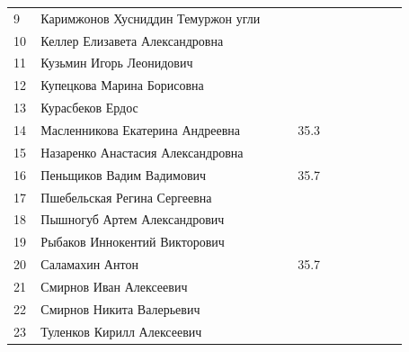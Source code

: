\documentclass[a4paper,landscape,11pt]{article}
\newcommand*\ok{&{\small \ding{51}}} %
\newcommand*\no{&{\small }} %
\begin{document}
\begin{tabular}{p{7pt}|l|p{\CS}|p{\CS}|p{\CT}|p{\CS}|p{\CS}|p{\CS}|p{\CS}|p{\CS}|p{\CS}}
9\,&   Каримжонов Хусниддин Темуржон угли \no\no\no  &&&&&\\
10\,&  Келлер Елизавета Александровна     \ok\ok\ok  &&&&\\
\midrule
11\,&  Кузьмин Игорь Леонидович           \ok\no\no  &&&&&\\ 
12\,&  Купецкова Марина Борисовна         \ok\no\no  &&&&&\\
13\,&  Курасбеков Ердос                   \ok\no\no  &&&&&\\
14\,&  Масленникова Екатерина Андреевна   \ok\ok&35.3&&&&&\\
15\,&  Назаренко Анастасия Александровна  \ok\no\no  &&&&&\\
\midrule
16\,&  Пеньщиков Вадим Вадимович          \no\no&35.7&&&&&\\
17\,&  Пшебельская Регина Сергеевна       \ok\no\no  &&&&&\\ 
18\,&  Пышногуб Артем Александрович       \ok\no\no  &&&&&\\
19\,&  Рыбаков Иннокентий Викторович      \no\no\no  &&&&&\\
20\,&  Саламахин Антон                    \ok\no&35.7&&&&&\\
\midrule
21\,&  Смирнов Иван Алексеевич            \no\no\no  &&&&&\\
22\,&  Смирнов Никита Валерьевич          \no\no\no  &&&&&\\
23\,&  Туленков Кирилл Алексеевич         \ok\no\no  &&&&&\\
\bottomrule
\end{tabular} 
\end{document}
